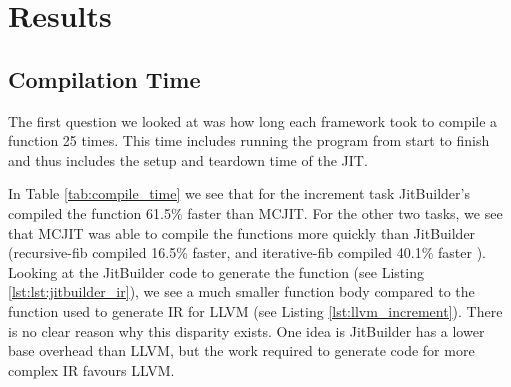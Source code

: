 \section{Results}
\label{sec:results}
\subsection{Compilation Time}
The first question we looked at was how long each framework took to compile a function 25 times. This time includes running the program from start to finish and thus includes the setup and teardown time of the JIT.

In Table \ref{tab:compile_time} we see that for the increment task JitBuilder's compiled the function 61.5\% faster than MCJIT.
For the other two tasks, we see that MCJIT was able to compile the functions more quickly than JitBuilder (recursive-fib compiled 16.5\% faster, and iterative-fib compiled 40.1\% faster ).
Looking at the JitBuilder code to generate the function (see Listing \ref{lst:lst:jitbuilder_ir}), we see a much smaller function body compared to the function used to generate IR for LLVM (see Listing \ref{lst:llvm_increment}).
There is no clear reason why this disparity exists.
One idea is JitBuilder has a lower base overhead than LLVM, but the work required to generate code for more complex IR favours LLVM.



